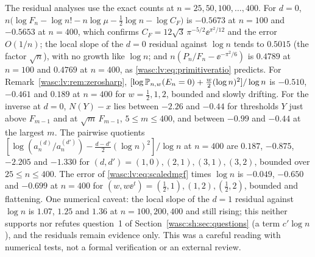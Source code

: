 \documentclass[11pt,a4paper]{article}
\theoremstyle{remark}\newtheorem{remark}[theorem]{Remark}
\numberwithin{equation}{section}
\begin{document}
The residual analyses use the exact counts at $n=25,50,100,\ldots,400$. For $d=0$, $n\bigl(\log F_n-\log n!-n\log\mu-\frac12\log n-\log C_F\bigr)$ is $-0.5673$ at $n=100$ and $-0.5653$ at $n=400$, which confirms $C_F=12\sqrt3\,\pi^{-5/2}\ee^{\pi^2/12}$ and the error $O(1/n)$; the local slope of the $d=0$ residual against $\log n$ tends to $0.5015$ (the factor $\sqrt n$), with no growth like $\log n$; and $n(P_n/F_n-\ee^{-\pi^2/6})$ is $0.4789$ at $n=100$ and $0.4769$ at $n=400$, as \eqref{wasc:lv:eq:primitiveratio} predicts. For Remark~\ref{wasc:lv:rem:zerosharp}, $[\log\mathbb P_{n,w}(E_n=0)+\frac w2(\log n)^2]/\log n$ is $-0.510$, $-0.461$ and $0.189$ at $n=400$ for $w=\frac12,1,2$, bounded and slowly drifting. For the inverse at $d=0$, $N(Y)-x$ lies between $-2.26$ and $-0.44$ for thresholds $Y$ just above $F_{m-1}$ and at $\sqrt m\,F_{m-1}$, $5\le m\le400$, and between $-0.99$ and $-0.44$ at the largest $m$. The pairwise quotients $[\log(a^{(d)}_n/a^{(d')}_n)-\frac{d-d'}2(\log n)^2]/\log n$ at $n=400$ are $0.187$, $-0.875$, $-2.205$ and $-1.330$ for $(d,d')=(1,0),(2,1),(3,1),(3,2)$, bounded over $25\le n\le400$. The error of \eqref{wasc:lv:eq:scaledmgf} times $\log n$ is $-0.049$, $-0.650$ and $-0.699$ at $n=400$ for $(w,w\ee^t)=(\frac12,1),(1,2),(\frac12,2)$, bounded and flattening. One numerical caveat: the local slope of the $d=1$ residual against $\log n$ is $1.07$, $1.25$ and $1.36$ at $n=100,200,400$ and still rising; this neither supports nor refutes question~1 of Section~\ref{wasc:sh:sec:questions} (a term $c'\log n$), and the residuals remain evidence only. This was a careful reading with numerical tests, not a formal verification or an external review.
\end{document}
